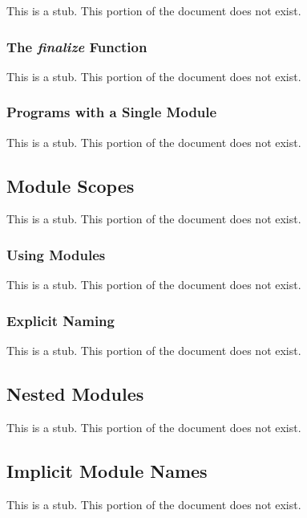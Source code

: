 This is a stub.  This portion of the document does not exist.

\subsubsection{The {\em finalize} Function}
\label{The_em_finalize_Function}

This is a stub.  This portion of the document does not exist.

\subsubsection{Programs with a Single Module}
\label{Programs_with_a_Single_Module}

This is a stub.  This portion of the document does not exist.

\subsection{Module Scopes}
\label{Module_Scopes}

This is a stub.  This portion of the document does not exist.

\subsubsection{Using Modules}
\label{Using_Modules}

This is a stub.  This portion of the document does not exist.

\subsubsection{Explicit Naming}
\label{Explicit_Naming}

This is a stub.  This portion of the document does not exist.

\subsection{Nested Modules}
\label{Nested_Modules}

This is a stub.  This portion of the document does not exist.

\subsection{Implicit Module Names}
\label{Implicit_Module_Names}

This is a stub.  This portion of the document does not exist.
